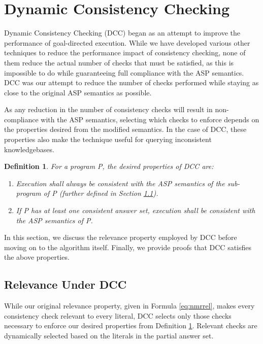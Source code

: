 \documentclass{new_tlp}
\newtheorem{definition}{Definition}
\begin{document}
\section{Dynamic Consistency Checking} \label{sec:dcc}

Dynamic Consistency Checking (DCC) began as an attempt to improve the 
performance of goal-directed execution. While we have developed various other 
techniques to reduce the performance impact of consistency checking, none of
them reduce the actual number of checks that must be satisfied, as this is
impossible to do while guaranteeing full compliance with the ASP semantics. DCC
was our attempt to reduce the number of checks performed while staying as close
to the original ASP semantics as possible.

As any reduction in the number of consistency checks will result in 
non-compliance with the ASP semantics, selecting which checks to enforce 
depends on the properties desired from the modified semantics. In the case of 
DCC, these properties also make the technique useful for querying inconsistent
knowledgebases.
\begin{definition} \label{def:properties}
For a program P, the \textit{desired properties} of DCC are:
\begin{enumerate}
\item Execution shall always be consistent with the ASP semantics of the
	sub-program of P (further defined in Section \ref{sec:dccrelevance}).
\item If P has at least one consistent answer set, execution shall be 
	consistent with the ASP semantics of P.
\end{enumerate}
\end{definition}

In this section, we discuss the relevance property employed by DCC before 
moving on to the algorithm itself. Finally, we provide proofs that DCC 
satisfies the above properties.


\subsection{Relevance Under DCC} \label{sec:dccrelevance}

While our original relevance property, given in Formula \ref{eq:nmrrel}, makes
every consistency check relevant to every literal, DCC selects only those
checks necessary to enforce our desired properties from Definition 
\ref{def:properties}. Relevant checks are dynamically selected based on the 
literals in the partial answer set.
\end{document}
